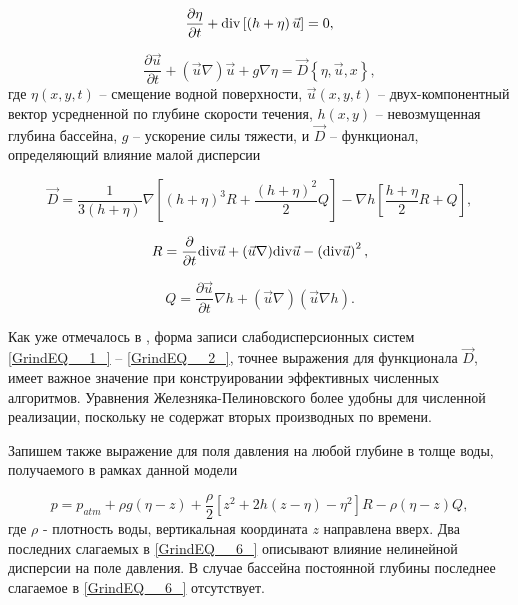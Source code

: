 \begin{equation} \label{GrindEQ__1_}
\frac{\partial \eta }{\partial t} +{\rm div}\left[\left(h+\eta \right)\vec{u}\right]=0,
\end{equation}

\begin{equation} \label{GrindEQ__2_}
\frac{\partial \vec{u}}{\partial t} +(\vec{u}\nabla )\vec{u}+g\nabla \eta =\vec{D}\left\{\eta ,\vec{u},x\right\},
\end{equation}
где $\eta(x,y,t)$ -- смещение водной поверхности, $\vec{u}(x,y,t)$ -- двух-компонентный вектор усредненной по глубине скорости течения, $h(x,y)$ -- невозмущенная глубина бассейна, $g$ -- ускорение силы тяжести, и $\vec{D}$ -- функционал, определяющий влияние малой дисперсии


\begin{equation} \label{GrindEQ__3_}
\vec{D}=\frac{1}{3\left(h+\eta \right)} \nabla \left[\left(h+\eta \right)^{3} R+\frac{(h+\eta )^{2} }{2} Q\right]-\nabla h\left[\frac{h+\eta }{2} R+Q\right],
\end{equation}

\begin{equation} \label{GrindEQ__4_}
R=\frac{\partial }{\partial t} {\rm div}\vec{u}+(\vec{u}\nabla ){\rm div}\vec{u}-\left({\rm div}\vec{u}\right)^{2} ,
\end{equation}

\begin{equation} \label{GrindEQ__5_}
Q=\frac{\partial \vec{u}}{\partial t} \nabla h+(\vec{u}\nabla )(\vec{u}\nabla h).
\end{equation}


Как уже отмечалось в \cite{Fedotova_2008}, форма записи слабодисперсионных систем \eqref{GrindEQ__1_} -- \eqref{GrindEQ__2_}, точнее выражения для функционала $\vec{D}$, имеет важное значение при конструировании эффективных численных алгоритмов. Уравнения Железняка-Пелиновского более удобны для численной реализации, поскольку не содержат вторых производных по времени.

 Запишем также выражение для поля давления на любой глубине в толще воды, получаемого в рамках данной модели \cite{Zhel_1985}\cite{Zhel_Pel_1985}


\begin{equation} \label{GrindEQ__6_}
p=p_{atm} +\rho g(\eta -z)+\frac{\rho }{2} \left[z^{2} +2h(z-\eta )-\eta ^{2} \right]R-\rho (\eta -z)Q,
\end{equation}
где $\rho$ - плотность воды, вертикальная координата $z$ направлена вверх. Два последних слагаемых в \eqref{GrindEQ__6_} описывают влияние нелинейной дисперсии на поле давления. В случае бассейна постоянной глубины последнее слагаемое в \eqref{GrindEQ__6_} отсутствует.


